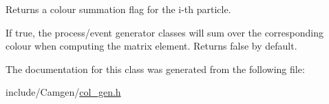Returns a colour summation flag for the i-\/th particle. 

If true, the process/event generator classes will sum over the corresponding colour when computing the matrix element. Returns false by default. 

The documentation for this class was generated from the following file\-:\begin{DoxyCompactItemize}
\item 
include/\-Camgen/\hyperlink{a00593}{col\-\_\-gen.\-h}\end{DoxyCompactItemize}
